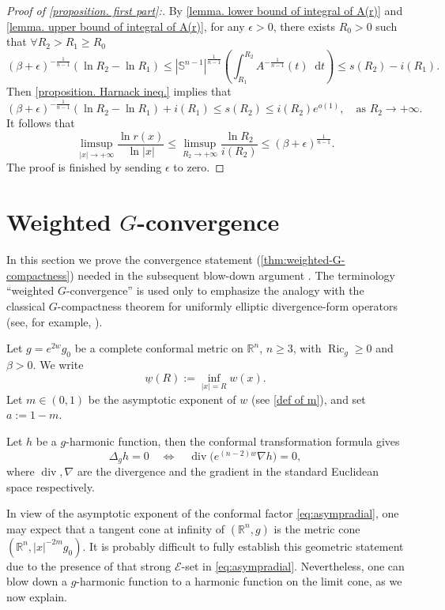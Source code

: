 \documentclass[12pt]{amsart}
\theoremstyle{plain}
\theoremstyle{definition}
\theoremstyle{remark}     %
\numberwithin{equation}{section}
\newcommand{\dd}{\mathop{}\!\mathrm{d}}%
\begin{document}
\begin{proof}[Proof of \cref{proposition. first part}:]
    By \cref{lemma. lower bound of integral of A(r)} and \cref{lemma. upper bound of integral of A(r)}, for any $\epsilon>0$, there exists $R_0>0$ such that $\forall R_2>R_1\geq R_0$
    \[
        (\beta+\epsilon)^{-\frac{1}{n-1}}
        (\ln R_2-\ln R_1)
        \leq 
        |\mathbb{S}^{n-1}|^{\frac{1}{n-1}}
        \left(
        \int_{R_1}^{R_2} A^{-\frac{1}{n-1}}(t)\dd t
        \right)
        \leq s(R_2)-i(R_1).
    \]
    Then \cref{proposition. Harnack ineq.} implies that
    \[
        (\beta+\epsilon)^{-\frac{1}{n-1}}(\ln R_2-\ln R_1)
        +i(R_1)
        \leq s(R_2)
        \leq i(R_2)e^{o(1)},\quad  \text{as } R_2\to +\infty.
    \]
    It follows that
    \[
        \limsup_{|x|\to+\infty}\frac{\ln r(x)}{\ln |x|}
        \leq \limsup_{R_2\to +\infty}\frac{\ln R_2}{i(R_2)}\leq (\beta+\epsilon)^{\frac{1}{n-1}}.
    \]
The proof is finished by sending $\epsilon$ to zero.
\end{proof}

\section{Weighted $G$-convergence}
\label{sec:weighted-G}

In this section we prove the convergence statement (\cref{thm:weighted-G-compactness}) needed in the subsequent blow-down argument .  The terminology ``weighted $G$-convergence'' is used only to emphasize the analogy with the classical $G$-compactness theorem for uniformly elliptic divergence-form operators
 (see, for example, \cite[Theorem 3]{ZKON}). 

Let
$g=e^{2w}g_0$
be a complete conformal metric on $\mathbb R^n$, $n\geq 3$, with
$\operatorname{Ric}_g\geq 0$ and $\beta>0$.  We write
\[
    \underline{w}(R):=\inf_{|x|=R}w(x).
\]
Let $m\in(0,1)$ be the asymptotic exponent of $w$ (see  \cref{def of m}), and set
$a:=1-m.$ 

Let $h$ be a $g$-harmonic function, then the conformal transformation formula gives
\[
    \Delta_g h=0
    \quad\Longleftrightarrow\quad
    \operatorname{div}\bigl(e^{(n-2)w}\nabla h\bigr)=0,
\]
where $\operatorname{div},\nabla$ are the divergence and the gradient in the standard Euclidean space respectively. 

In view of the asymptotic exponent of the conformal factor \cref{eq:asympradial}, one may expect that a tangent cone at infinity of $(\mathbb{R}^n, g)$ is the metric cone $(\mathbb{R}^n, |x|^{-2m} g_0)$. It is probably difficult to fully establish this geometric statement due to the presence of that strong 
$\mathcal{E}$-set in \cref{eq:asympradial}.
Nevertheless, one can blow down a $g$-harmonic function to a harmonic function on the limit cone, as we now explain.
\end{document}
